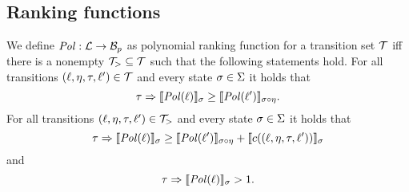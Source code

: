 \subsection{Ranking functions}

\begin{definition} 
	We define $\mathit{Pol}: \mathcal{L} \rightarrow \mathcal{B}_p$ as polynomial ranking function for a transition set $\mathcal{T}$ iff there is a nonempty $\mathcal{T}_{>} \subseteq \mathcal{T}$ such that the following statements hold.
        For all transitions $(\ell, \eta, \tau, \ell') \in \mathcal{T}$ and every state $\sigma \in \Sigma$ it holds that
	\[ \tau \Rightarrow \llbracket \mathit{Pol}(\ell) \rrbracket_{\sigma} \geq \llbracket \mathit{Pol}(\ell') \rrbracket_{\sigma \circ \eta}. \]
        For all transitions $(\ell, \eta, \tau, \ell') \in \mathcal{T}_{>}$ and every state $\sigma \in \Sigma$ it holds that        
	\[ \tau \Rightarrow \llbracket \mathit{Pol}(\ell) \rrbracket_{\sigma} \geq \llbracket \mathit{Pol}(\ell') \rrbracket_{\sigma \circ \eta} + \llbracket c((\ell, \eta, \tau, \ell')) \rrbracket_{\sigma} \]
        and
	\[ \tau \Rightarrow \llbracket \mathit{Pol}(\ell) \rrbracket_{\sigma} > 1. \]
\end{definition}
